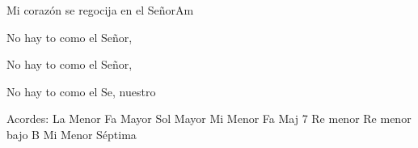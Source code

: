 \documentclass[12pt, spanish]{book}
\begin{document}
\begin{song}{Mi corazón se regocija en el Señor}{Am}

        \begin{SBChorus}
            No hay to como el Señor,

            No hay to como el Señor,

            No hay to como el Se, nuestro  
        \end{SBChorus}


        \ifChordBk
        \begin{SBOpGroup}
            Acordes:\break
            \upchord{\Am}\qquad La Menor \hfill
            \upchord{\F}\qquad Fa Mayor \hfill\null\break
            \upchord{\G}\qquad Sol Mayor \hfill
            \upchord{\Em}\qquad Mi Menor \hfill\null\break
            \upchord{\FMaj}\qquad Fa Maj 7 \hfill
            \upchord{\Dm}Re menor \hfill\null\break
            \upchord{\DmB}\qquad Re menor bajo B \hfill
            \upchord{\Emseven}\qquad Mi Menor S\'eptima \hfill\null\break
        \end{SBOpGroup}
        \fi
    \end{song}
\end{document}
